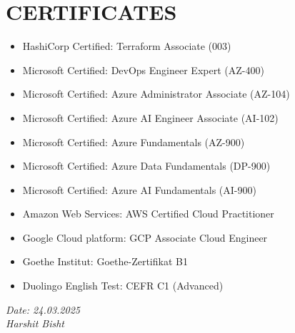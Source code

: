 \documentclass[11pt,a4paper]{article}
\begin{document}
\section*{CERTIFICATES}
\begin{itemize}
    \item HashiCorp Certified: Terraform Associate (003)
    \item Microsoft Certified: DevOps Engineer Expert (AZ-400)
    \item Microsoft Certified: Azure Administrator Associate (AZ-104)
    \item Microsoft Certified: Azure AI Engineer Associate (AI-102)
    \item Microsoft Certified: Azure Fundamentals (AZ-900)
    \item Microsoft Certified: Azure Data Fundamentals (DP-900)
    \item Microsoft Certified: Azure AI Fundamentals (AI-900)
    \item Amazon Web Services: AWS Certified Cloud Practitioner
    \item Google Cloud platform: GCP Associate Cloud Engineer
    \item Goethe Institut: Goethe-Zertifikat B1
    \item Duolingo English Test: CEFR C1 (Advanced)
\end{itemize}


\vfill %
\noindent %
\begin{flushright} %
    \textit{Date: 24.03.2025}\\ %
    \textit{Harshit Bisht} %
\end{flushright}
\end{document}
